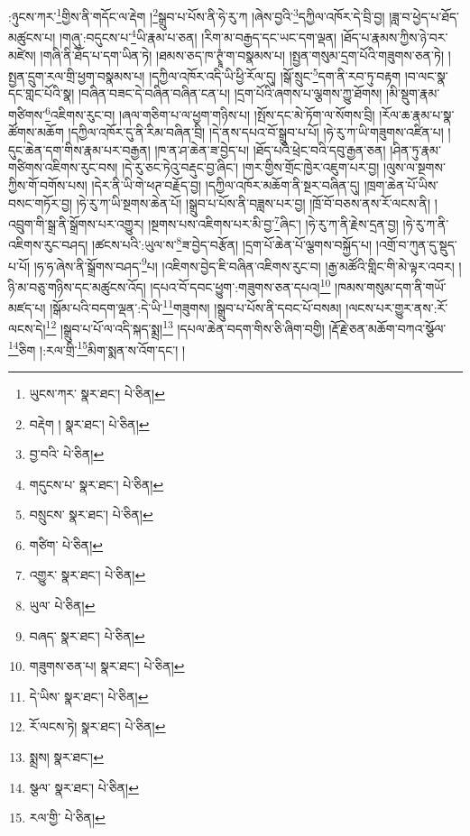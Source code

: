 :ཉུངས་ཀར་\footnote{ཡུངས་ཀར་  སྣར་ཐང་།  པེ་ཅིན། }གྱིས་ནི་གདོང་ལ་རྡེག །\footnote{བརྡེག །  སྣར་ཐང་།  པེ་ཅིན། }སྒྲུབ་པ་པོས་ནི་ཧེ་རུ་ཀ །ཞེས་བྱའི་\footnote{བྱ་བའི་  པེ་ཅིན། }དཀྱིལ་འཁོར་དེ་བྲི་བྱ། །ཟླ་བ་ཕྱེད་པ་ཐོད་མཚུངས་པ། །གཞུ་:བདུངས་པ་\footnote{གདུངས་པ་  སྣར་ཐང་།  པེ་ཅིན། }ཡི་རྣམ་པ་ཅན། །རིག་མ་བརྒྱད་དང་ཡང་དག་ལྡན། །ཐོད་པ་རྣམས་ཀྱིས་ཉེ་བར་མཛེས། །གཞི་ནི་ཐོད་པ་དག་ཡིན་ཏེ། །ཐམས་ཅད་ཁ་ཊྭཱཾ་ག་བསྣམས་པ། །སྤྱན་གསུམ་དྲག་པོའི་གཟུགས་ཅན་ཏེ། །སྤྱན་དྲུག་རལ་གྲི་ཕྱག་བསྣམས་པ། །དཀྱིལ་འཁོར་འདི་ཡི་ཕྱི་རོལ་དུ། །སྒོ་སྲུང་\footnote{བསྲུངས་  སྣར་ཐང་།  པེ་ཅིན། }དག་ནི་རབ་ཏུ་བརྟག །བ་ལང་སྣ་དང་གླང་པོའི་སྣ། །བཞིན་བཟང་དེ་བཞིན་བཞིན་ངན་པ། །དྲག་པོའི་ཞགས་པ་ལྕགས་ཀྱུ་ཐོགས། །མི་སྡུག་རྣམ་གཙིགས་\footnote{གཙིག་  པེ་ཅིན། }འཇིགས་རུང་བ། །ཞལ་གཅིག་པ་ལ་ཕྱག་གཉིས་པ། །སྤོས་དང་མེ་ཏོག་ལ་སོགས་བྲི། །རོལ་ཆ་རྣམ་པ་སྣ་ཚོགས་མཆོག །དཀྱིལ་འཁོར་དུ་ནི་རིམ་བཞིན་བྲི། །དེ་ནས་དཔའ་བོ་སྒྲུབ་པ་པོ། །ཧེ་རུ་ཀ་ཡི་གཟུགས་འཛིན་པ། །དུང་ཆེན་དག་གིས་རྣམ་པར་བརྒྱན། །ཁ་ན་ཤ་ཆེན་ཟ་བྱེད་པ། །ཐོད་པའི་ཕྲེང་བའི་དབུ་རྒྱན་ཅན། །ཤིན་ཏུ་རྣམ་གཙིགས་འཇིགས་རུང་བས། །དེ་རུ་ཅང་ཏེའུ་བརྡུང་བྱ་ཞིང་། །གར་གྱིས་གྲོང་ཁྱེར་འཇུག་པར་བྱ། །ལུས་ལ་སྔགས་ཀྱིས་གོ་བགོས་པས། །དེར་ནི་ཡི་གེ་ཕཊ་བརྗོད་བྱ། །དཀྱིལ་འཁོར་མཆོག་ནི་སྔར་བཞིན་དུ། །ཁྲག་ཆེན་པོ་ཡིས་བསང་གཏོར་བྱ། །ཧེ་རུ་ཀ་ཡི་སྔགས་ཆེན་པོ། །སྒྲུབ་པ་པོས་ནི་བཟླས་པར་བྱ། །ཁྲོ་བོ་བཅས་ནས་རོ་ལངས་ནི། །འབྲུག་གི་སྒྲ་ནི་སྒྲོགས་པར་འགྱུར། །སྔགས་པས་འཇིགས་པར་མི་བྱ་\footnote{འགྱུར་  སྣར་ཐང་།  པེ་ཅིན། }ཞིང་། །ཧེ་རུ་ཀ་ནི་རྗེས་དྲན་བྱ། །ཧེ་རུ་ཀ་ནི་འཇིགས་རུང་བཤད། །ཚངས་པའི་:ཡུལ་ས་\footnote{ཡུལ་  པེ་ཅིན། }ཟ་བྱེད་བརྩོན། །དྲག་པོ་ཆེན་པོ་ལྕགས་བསྐྱོད་པ། །འགྲོ་བ་ཀུན་དུ་སྡུད་པ་པོ། །ཧ་ཧ་ཞེས་ནི་སྒྲོགས་བཤད་\footnote{བཞད་  སྣར་ཐང་།  པེ་ཅིན། }པ། །འཇིགས་བྱེད་ཇི་བཞིན་འཇིགས་རུང་བ། །རྒྱ་མཚོའི་གླིང་གི་མེ་ལྟར་འབར། །ཉི་མ་བཅུ་གཉིས་དང་མཚུངས་འོད། །དཔའ་བོ་དབང་ཕྱུག་:གཟུགས་ཅན་དཔའ།\footnote{གཟུགས་ཅན་པ།  སྣར་ཐང་།  པེ་ཅིན། } །ཁམས་གསུམ་དག་ནི་གཡོ་མཛད་པ། །སྒོམ་པའི་བདག་ལྡན་:དེ་ཡི་\footnote{དེ་ཡིས་  སྣར་ཐང་།  པེ་ཅིན། }གཟུགས། །སྒྲུབ་པ་པོས་ནི་དབང་པོ་བསམ། །ལངས་པར་གྱུར་ནས་:རོ་ལངས་དེ།\footnote{རོ་ལངས་ཏེ།  སྣར་ཐང་།  པེ་ཅིན། } །སྒྲུབ་པ་པོ་ལ་འདི་སྐད་སྨྲ།\footnote{སྨྲས།  སྣར་ཐང་། } །དཔལ་ཆེན་བདག་གིས་ཅི་ཞིག་བགྱི། །རྡོ་རྗེ་ཅན་མཆོག་བཀའ་སྩོལ་\footnote{སྩལ་  སྣར་ཐང་།  པེ་ཅིན། }ཅིག །:རལ་གྲི་\footnote{རལ་གྱི་  པེ་ཅིན། }མིག་སྨན་ས་འོག་དང་། །
